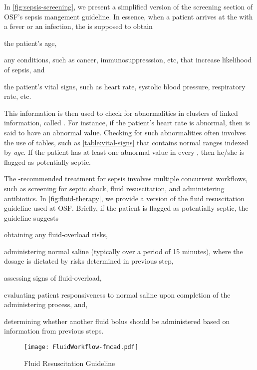 In \autoref{fig:sepsis-screening}, we present a simplified version of
the screening section of OSF's sepsis mangement guideline.
In essence, when a patient arrives at the
\ED{} with a fever or an infection, the \HCP{} is supposed to obtain
\begin{enumerate*}[label=(\alph*)]
  \item the patient's age,
  \item any conditions, such as cancer, immunosuppresssion, etc,
    that increase likelihood of sepsis, and
  \item the patient's vital signs, such as heart rate, systolic blood
    pressure, respiratory rate, etc.
\end{enumerate*}

This information is then used to check for abnormalities
in clusters of linked information, called . For instance, if
the patient's heart rate is abnormal, then  is said to
have an abnormal value.
Checking for such abnormalities often involves the use of tables, such as
\autoref{table:vital-signs} that contains normal ranges indexed by
\emph{age}.
If the patient has at least one abnormal value in every ,
then he/she is flagged as potentially septic.

The \BPG{}-recommended treatment for
sepsis involves multiple concurrent workflows, such as
screening for septic shock, fluid resuscitation, and administering antibiotics.
In \autoref{fig:fluid-therapy}, we provide
a version of the fluid resuscitation guideline used
at OSF. Briefly, if the patient is flagged as potentially septic, the guideline suggests
\begin{enumerate*}[label=(\roman*)]
  \item obtaining any fluid-overload risks,
  \item administering normal saline (typically over a period of 15 minutes),
    where the dosage is dictated by risks determined in previous step,
  \item assessing signs of fluid-overload,
  \item evaluating patient responsiveness to normal saline upon completion of
    the administering process, and,
  \item determining whether another fluid bolus should be administered based on
    information from previous steps.
\end{enumerate*}
\begin{figure}[h]
  \centering
  \texttt{[image: FluidWorkflow-fmcad.pdf]}
  \caption{Fluid Resuscitation Guideline}\label{fig:fluid-therapy}
\end{figure}

